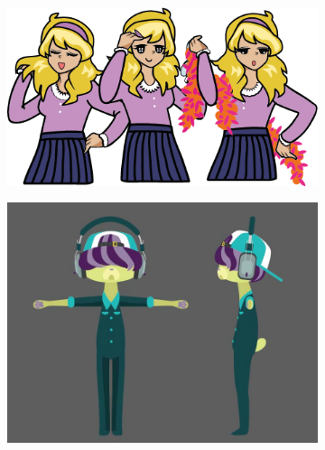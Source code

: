 \begin{figure}[H]
  \centering\begin{subfigure}{.4\textwidth}
    \centering
    \includegraphics[width=.9\linewidth]{images/ref_CAT03}
  \end{subfigure}
  \begin{subfigure}{.4\textwidth}
    \centering
    \includegraphics[width=.9\linewidth]{images/ref_CAT04}
  \end{subfigure}
  \begin{subfigure}{.3\textwidth}
    \centering

\end{subfigure}
\end{figure}
